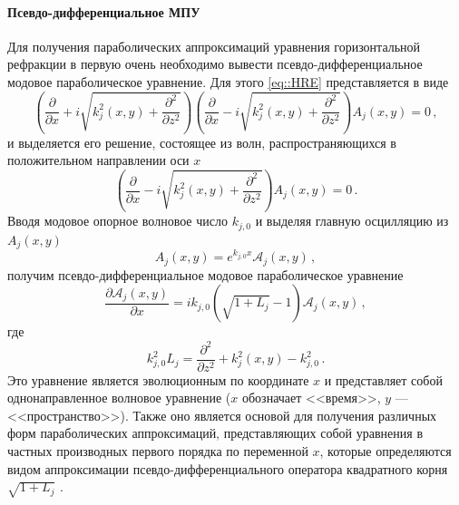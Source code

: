 \documentclass{fefu}
\newcommand{\pa}[1]{\left(#1\right)}
\begin{document}
                \paragraph{\label{sec::PDMPE}Псевдо-дифференциальное МПУ}
                    \par Для получения параболических аппроксимаций уравнения горизонтальной рефракции в первую очень необходимо вывести псевдо-дифференциальное модовое параболическое уравнение. Для этого \eqref{eq::HRE} представляется в виде
                    \begin{equation}
                        \pa{\frac{\partial}{\partial x}+i\sqrt{k_j^2\pa{x,y}+\frac{\partial^2}{\partial z^2}}}\pa{\frac{\partial}{\partial x}-i\sqrt{k_j^2\pa{x,y}+\frac{\partial^2}{\partial z^2}}}A_j\pa{x,y}=0\,,
                    \end{equation}
                    и выделяется его решение, состоящее из волн, распространяющихся в положительном направлении оси $x$
                    \begin{equation}
                        \pa{\frac{\partial}{\partial x}-i\sqrt{k_j^2\pa{x,y}+\frac{\partial^2}{\partial z^2}}}A_j\pa{x,y}=0\,.
                    \end{equation}
                    Вводя модовое опорное волновое число $k_{j,0}$ и выделяя главную осцилляцию из $A_j\pa{x,y}$
                    \begin{equation*}
                        A_j\pa{x,y}=e^{k_{j,0}x}\mathcal{A}_j\pa{x,y}\,,
                    \end{equation*}
                    получим псевдо-дифференциальное модовое параболическое уравнение
                    \begin{equation}\label{eq::PDMPE}
                        \frac{\partial\mathcal{A}_j\pa{x,y}}{\partial x}=ik_{j,0}\pa{\sqrt{1+L_j}-1}\mathcal{A}_j\pa{x,y}\,,
                    \end{equation}
                    где 
                    \begin{equation*}
                        k_{j,0}^2L_j=\frac{\partial^2}{\partial z^2}+k_j^2\pa{x,y}-k_{j,0}^2\,.
                    \end{equation*}
                    Это уравнение является эволюционным по координате $x$ и представляет собой однонаправленное волновое уравнение ($x$ обозначает <<время>>, $y$ --- <<пространство>>). Также оно является основой для получения различных форм параболических аппроксимаций, представляющих собой уравнения в частных производных первого порядка по переменной $x$, которые определяются видом аппроксимации псевдо-дифференциального оператора квадратного корня $\sqrt{1+L_j}$ \cite{jensen}.
\end{document}

